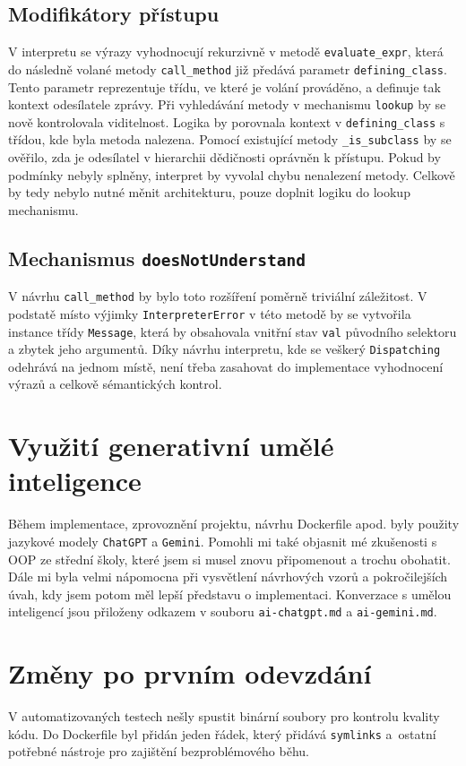 \documentclass[a4paper,12pt]{article}
\begin{document}
\subsection{Modifikátory přístupu}
V interpretu se výrazy vyhodnocují rekurzivně v metodě \texttt{evaluate\_expr}, která do následně volané metody \texttt{call\_method} 
již předává parametr \texttt{defining\_class}. Tento parametr reprezentuje třídu, ve které je volání prováděno, 
a definuje tak kontext odesílatele zprávy.
Při vyhledávání metody v mechanismu \texttt{lookup} by se nově kontrolovala viditelnost. Logika by porovnala kontext v \texttt{defining\_class} s třídou, 
kde byla metoda nalezena. Pomocí existující metody \texttt{\_is\_subclass} by se ověřilo, 
zda je odesílatel v hierarchii dědičnosti oprávněn k přístupu.
Pokud by podmínky nebyly splněny, interpret by vyvolal chybu nenalezení metody. Celkově by tedy nebylo nutné měnit architekturu, 
pouze doplnit logiku do lookup mechanismu.

\subsection{Mechanismus \texttt{doesNotUnderstand}}
V návrhu \texttt{call\_method} by bylo toto rozšíření poměrně triviální záležitost. V podstatě místo výjimky \texttt{InterpreterError} v této metodě by
se vytvořila instance třídy \texttt{Message}, která by obsahovala vnitřní stav \texttt{val} původního selektoru a zbytek jeho argumentů.
Díky návrhu interpretu, kde se veškerý \texttt{Dispatching} odehrává na jednom místě, není třeba zasahovat do implementace vyhodnocení výrazů a celkově
sémantických kontrol.

\section{Využití generativní umělé inteligence}
Během implementace, zprovoznění projektu, návrhu Dockerfile apod. byly použity jazykové modely \texttt{ChatGPT} a \texttt{Gemini}.
Pomohli mi také objasnit mé zkušenosti s OOP ze střední školy, které jsem si musel znovu připomenout a trochu obohatit.
Dále mi byla velmi nápomocna při vysvětlení návrhových vzorů a pokročilejších úvah, kdy jsem potom měl lepší představu o implementaci.
Konverzace s umělou inteligencí jsou přiloženy odkazem v souboru \texttt{ai-chatgpt.md} a \texttt{ai-gemini.md}.

\section{Změny po prvním odevzdání}
V automatizovaných testech nešly spustit binární soubory pro kontrolu kvality kódu. Do Dockerfile byl 
přidán jeden řádek, který přidává \texttt{symlinks} a~ostatní potřebné nástroje pro zajištění bezproblémového běhu.
\end{document}
